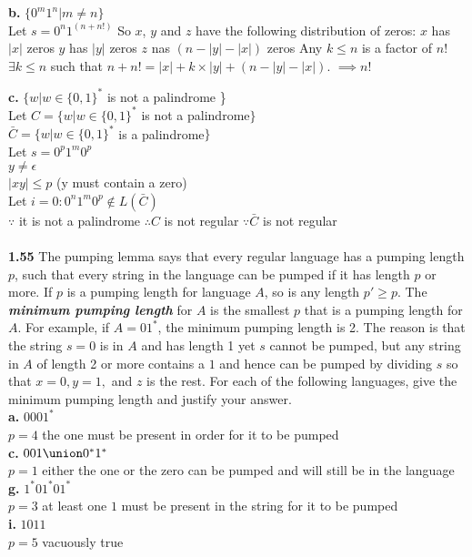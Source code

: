 \documentclass{article}
\begin{document}
{\bf b.} $\{0^{m}1^{n} | m \neq n\}$\\
\subitem Let $s = 0^n1^{(n+n!)}$
\subitem So $x$, $y$ and $z$ have the following distribution of zeros:
	\subsubitem $x$ has $|x|$ zeros
	\subsubitem $y$ has $|y|$ zeros
	\subsubitem $z$ nas $(n - |y| - |x|)$ zeros
\subitem Any $k \le n$ is a factor of $n!$
\subitem $\exists k \le n$ such that $n + n! = |x| + k \times |y| + (n - |y| - |x|)$.
\subitem $\implies n! $



{\bf c.} $\{w | w \in \{0,1\}^{*} $ is not a palindrome \} \\
\subitem
Let $C = \{w | w \in \{0,1\}^{*} $ is not a palindrome$ \}$\\
$\bar{C} = \{w | w \in \{0,1\}^{*} $ is a palindrome$ \}$\\
Let $s = 0^{p}1^{m}0^{p}$\\
$y \neq \epsilon$\\
$|xy| \leq p$ (y must contain a zero)\\
Let $i = 0 : 0^{n}1^{m}0^{p} \notin L(\bar{C})$\\
$\because$ it is not a palindrome
$\therefore C$ is not regular
$\because \bar{C}$ is not regular\\
\\

{\bf 1.55} The pumping lemma says that every regular language has a pumping length $p$, such that every string in the language can be pumped if it has length $p$ or more. If $p$ is a pumping length for language $A$, so is any length $p' \geq p$. The {\bf {\em minimum pumping length}} for $A$ is the smallest $p$ that is a pumping length for $A$. For example, if $A = 01^{*}$, the minimum pumping length is 2. The reason is that the string $s=0$ is in $A$ and has length 1 yet $s$ cannot be pumped, but any string in $A$ of length 2 or more contains a $1$ and hence can be pumped by dividing $s$ so that $x=0, y = 1,$ and $z$ is the rest. For each of the following languages, give the minimum pumping length and justify your answer.
\\{\bf a.} $0001^{*}$
\\$p=4$ the one must be present in order for it to be pumped
\\{\bf c.} $001 \union 0^{*}1^{*}$
\\$p=1$ either the one or the zero can be pumped and will still be in the language
\\{\bf g.} $1^{*}01^{*}01^{*}$
\\$p=3$ at least one $1$ must be present in the string for it to be pumped
\\{\bf i.} $1011$
\\$p=5$ vacuously true
\end{document}
